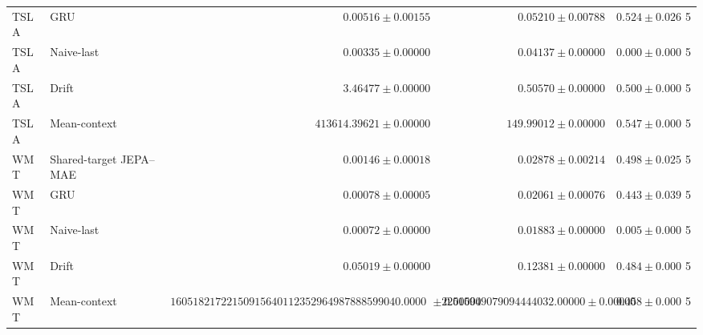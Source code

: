 \begin{longtable}{llrrrr}
TSLA & GRU & $0.00516 \pm 0.00155$ & $0.05210 \pm 0.00788$ & $0.524 \pm 0.026$ & 5 \\
TSLA & Naive-last & $0.00335 \pm 0.00000$ & $0.04137 \pm 0.00000$ & $0.000 \pm 0.000$ & 5 \\
TSLA & Drift & $3.46477 \pm 0.00000$ & $0.50570 \pm 0.00000$ & $0.500 \pm 0.000$ & 5 \\
TSLA & Mean-context & $413614.39621 \pm 0.00000$ & $149.99012 \pm 0.00000$ & $0.547 \pm 0.000$ & 5 \\
WMT & Shared-target JEPA--MAE & $0.00146 \pm 0.00018$ & $0.02878 \pm 0.00214$ & $0.498 \pm 0.025$ & 5 \\
WMT & GRU & $0.00078 \pm 0.00005$ & $0.02061 \pm 0.00076$ & $0.443 \pm 0.039$ & 5 \\
WMT & Naive-last & $0.00072 \pm 0.00000$ & $0.01883 \pm 0.00000$ & $0.005 \pm 0.000$ & 5 \\
WMT & Drift & $0.05019 \pm 0.00000$ & $0.12381 \pm 0.00000$ & $0.484 \pm 0.000$ & 5 \\
WMT & Mean-context & $16051821722150915640112352964987888599040.00000 \pm 0.00000$ & $22515949079094444032.00000 \pm 0.00000$ & $0.458 \pm 0.000$ & 5 \\
\bottomrule
\end{longtable}
